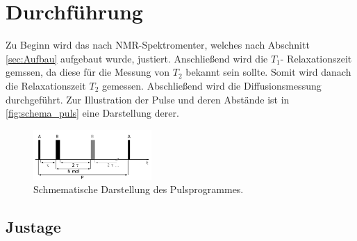 \section{Durchführung}
\label{sec:durchführung}

    \noindent Zu Beginn wird das nach NMR-Spektromenter, welches nach Abschnitt \ref{sec:Aufbau} aufgebaut wurde, justiert. Anschließend wird die $T_1$- Relaxationszeit gemssen, da diese für die Messung von $T_2$ bekannt 
    sein sollte. Somit wird danach die Relaxationszeit $T_2$ gemessen.  Abschließend wird die Diffusionsmessung durchgeführt. Zur Illustration der Pulse und deren Abstände ist in \autoref{fig:schema_puls} eine Darstellung
    derer. 

    \begin{figure}
        \centering
        \includegraphics[width=0.4\textwidth]{images/schema_puls.png}
        \caption{Schmematische Darstellung des Pulsprogrammes. \cite{V49}}
        \label{fig:schema_puls}
    \end{figure}

    \subsection{Justage}

